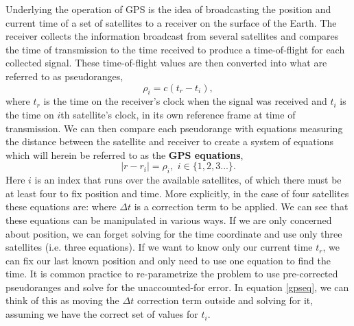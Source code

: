 Underlying the operation of GPS is the idea of broadcasting the position and current time of a set of satellites to a receiver on the surface of the Earth. The receiver collects the information broadcast from several satellites and compares the time of transmission to the time received to produce a time-of-flight for each collected signal.
These time-of-flight values are then converted into what are referred to as pseudoranges, $$\rho_i=c(t_{r}-t_{i}),$$ where $t_r$ is the time on the receiver's clock when the signal was received and $t_i$ is the time on $i$th satellite's clock, in its own reference frame at time of transmission. We can then compare each pseudorange with equations measuring the distance between the satellite and receiver to create a system of equations which will herein be referred to as the \textbf{GPS equations},
$$
|r-r_i|=\rho_i, \,\, i \in \{1,2,3...\}.
$$
Here $i$ is an index that runs over the available satellites, of which there must be at least four to fix position and time. More explicitly, in the case of four satellites these equations are:
where $\Delta t$ is a correction term to be applied. We can see that these equations can be manipulated in various ways. If we are only concerned about position, we can forget solving for the time coordinate and use only three satellites (i.e. three equations). If we want to know only our current time $t_r$, we can fix our last known position and only need to use one equation to find the time. It is common practice to re-parametrize the problem to use pre-corrected pseudoranges and solve for the unaccounted-for error. In equation \ref{gpseq}, we can think of this as moving the $\Delta t$ correction term outside and solving for it, assuming we have the correct set of values for $t_i$. 

